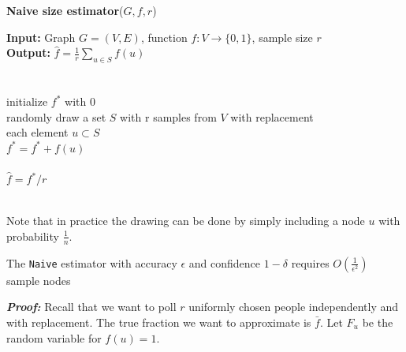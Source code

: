 \begin{algorithm*}[!htb]
  \caption{\small {\bf Naive size estimator}($G, f, r$)}
  \begin{code}
  {\bf Input:} Graph $G=(V,E)$, function $f : V \rightarrow \{0,1\}$, sample size $r$ \\
  {\bf Output:} $\hat{f}=\frac{1}{r}\sum\nolimits_{u\in S} f(u)$\\
  \\
  \uln \>\ubegin\\
  \uln \>\>initialize $f^*$ with 0 \\
  \uln \>\>randomly draw a set $S$ with r samples from $V$ with replacement\\
  \uln \>\>\ufor each element $u \subset S$ \udo\\
  \uln \>\>\>$f^* = f^* + f(u)$ \\
  \uln \>\>\uend\\
  \uln \>\ureturn $\hat{f} = f^*/r$ \\
  \uln \>\uend\\ 
  \end{code}
  \label{alg:main}
\end{algorithm*}
Note that in practice the drawing can be done by simply including a node $u$ with probability $\frac{1}{n}$.
\begin{theorem}
  The \texttt{Naive} estimator with accuracy $\epsilon$ and confidence $1-\delta$ requires $O(\frac{1}{\epsilon^2})$ sample nodes
\end{theorem}
\textbf{\textit{Proof: }}Recall that we want to poll $r$ uniformly chosen people independently and with replacement. The true fraction we want to approximate is $\bar{f}$. Let $F_u$ be the random variable for $f(u) = 1$.

